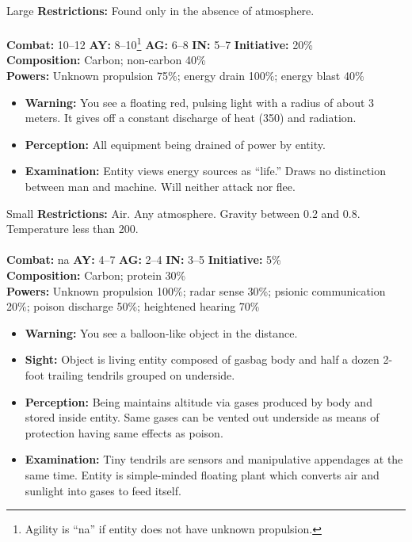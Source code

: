 \hrulefill

\begin{creature}{Large}
\textbf{Restrictions:} Found only in the absence of atmosphere. \\\\
\textbf{Combat:} 10--12 \textbf{AY:} 8--10\footnote{Agility is ``na'' if entity does not have unknown propulsion.} \textbf{AG:} 6--8 \textbf{IN:} 5--7 \textbf{Initiative:} 20\% \\
\textbf{Composition:} Carbon; non-carbon 40\% \\
\textbf{Powers:} Unknown propulsion 75\%; energy drain 100\%; energy blast 40\% 
\begin{itemize}
\item \textbf{Warning:} You see a floating red, pulsing light with a radius of about 3 meters. It gives off a constant discharge of heat (350\textdegree) and 
radiation. 
\item \textbf{Perception:} All equipment being drained of power by entity. 
\item \textbf{Examination:} Entity views energy sources as ``life.'' Draws no distinction between man and machine. Will neither attack nor flee. 
\end{itemize}
\end{creature}

\hrulefill

\begin{creature}{Small}
\textbf{Restrictions:} Air. Any atmosphere. Gravity between 0.2 and 0.8. Temperature less than 200\textdegree. \\\\
\textbf{Combat:} na \textbf{AY:} 4--7 \textbf{AG:} 2--4 \textbf{IN:} 3--5 \textbf{Initiative:} 5\% \\
\textbf{Composition:} Carbon; protein 30\% \\
\textbf{Powers:} Unknown propulsion 100\%; radar sense 30\%; psionic communication 20\%; poison discharge 50\%; heightened hearing 70\% 
\begin{itemize}
\item \textbf{Warning:} You see a balloon-like object in the distance. 
\item \textbf{Sight:} Object is living entity composed of gasbag body and half a dozen 2-foot trailing tendrils grouped on underside. 
\item \textbf{Perception:} Being maintains altitude via gases produced by body and stored inside entity. Same gases can be vented out underside 
as means of protection having same effects as poison. 
\item \textbf{Examination:} Tiny tendrils are sensors and manipulative appendages at the same time. Entity is simple-minded floating plant which 
converts air and sunlight into gases to feed itself. 
\end{itemize}
\end{creature}

